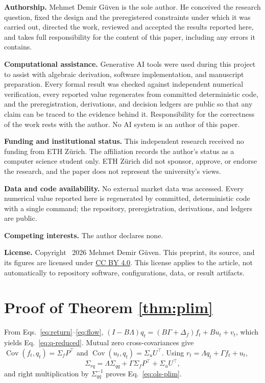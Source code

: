 \documentclass[10pt,twocolumn]{article}
\theoremstyle{remark}
\newcommand{\Cov}{\operatorname{Cov}}
\begin{document}
{\small
\noindent\textbf{Authorship.} Mehmet Demir G\"uven is the sole author. He
conceived the research question, fixed the design and the preregistered
constraints under which it was carried out, directed the work, reviewed and
accepted the results reported here, and takes full responsibility for the
content of this paper, including any errors it contains.

\smallskip
\noindent\textbf{Computational assistance.} Generative AI tools were used
during this project to assist with algebraic derivation, software
implementation, and manuscript preparation. Every formal result was checked
against independent numerical verification, every reported value regenerates
from committed deterministic code, and the preregistration, derivations, and
decision ledgers are public so that any claim can be traced to the evidence
behind it. Responsibility for the correctness of the work rests with the
author. No AI system is an author of this paper.

\smallskip
\noindent\textbf{Funding and institutional status.} This independent research
received no funding from ETH Z\"urich. The affiliation records the author's
status as a computer science student only. ETH Z\"urich did not sponsor,
approve, or endorse the research, and the paper does not represent the
university's views.

\smallskip
\noindent\textbf{Data and code availability.} No external market data was
accessed. Every numerical value reported here is regenerated by committed,
deterministic code with a single command; the repository, preregistration,
derivations, and ledgers are public.

\smallskip
\noindent\textbf{Competing interests.} The author declares none.

\smallskip
\noindent\textbf{License.} Copyright \textcopyright\ 2026 Mehmet Demir
G\"uven. This preprint, its source, and its figures are licensed under
\href{https://creativecommons.org/licenses/by/4.0/}{CC BY 4.0}. This license
applies to the article, not automatically to repository software,
configurations, data, or result artifacts.
}

\appendix

\section{Proof of Theorem \ref{thm:plim}}
\label{app:plim}

From Eqs.~\eqref{eq:return}--\eqref{eq:flow},
$(I-B\Lambda)q_t=(B\Gamma+\Delta_f)f_t+Bu_t+v_t$, which yields
Eq.~\eqref{eq:q-reduced}. Mutual zero cross-covariances give
$\Cov(f_t,q_t)=\Sigma_fP^\top$ and $\Cov(u_t,q_t)=\Sigma_uU^\top$. Using
$r_t=\Lambda q_t+\Gamma f_t+u_t$,
\begin{equation}
\Sigma_{rq}=\Lambda\Sigma_{qq}+\Gamma\Sigma_fP^\top+\Sigma_uU^\top,
\end{equation}
and right multiplication by $\Sigma_{qq}^{-1}$ proves
Eq.~\eqref{eq:ols-plim}.
\end{document}
